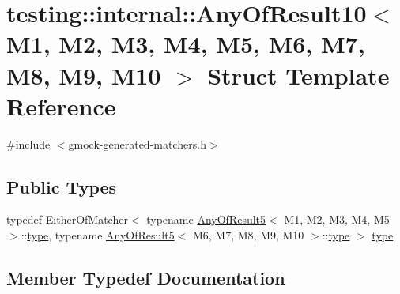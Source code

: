 \hypertarget{structtesting_1_1internal_1_1_any_of_result10}{}\section{testing\+::internal\+::Any\+Of\+Result10$<$ M1, M2, M3, M4, M5, M6, M7, M8, M9, M10 $>$ Struct Template Reference}
\label{structtesting_1_1internal_1_1_any_of_result10}


{\ttfamily \#include $<$gmock-\/generated-\/matchers.\+h$>$}

\subsection*{Public Types}
\begin{DoxyCompactItemize}
\item 
typedef Either\+Of\+Matcher$<$ typename \mbox{\hyperlink{structtesting_1_1internal_1_1_any_of_result5}{Any\+Of\+Result5}}$<$ M1, M2, M3, M4, M5 $>$\+::\mbox{\hyperlink{structtesting_1_1internal_1_1_any_of_result10_aa1cb3d733f29716f2015db8a2b6c1c94}{type}}, typename \mbox{\hyperlink{structtesting_1_1internal_1_1_any_of_result5}{Any\+Of\+Result5}}$<$ M6, M7, M8, M9, M10 $>$\+::\mbox{\hyperlink{structtesting_1_1internal_1_1_any_of_result10_aa1cb3d733f29716f2015db8a2b6c1c94}{type}} $>$ \mbox{\hyperlink{structtesting_1_1internal_1_1_any_of_result10_aa1cb3d733f29716f2015db8a2b6c1c94}{type}}
\end{DoxyCompactItemize}


\subsection{Member Typedef Documentation}
\mbox{\label{structtesting_1_1internal_1_1_any_of_result10_aa1cb3d733f29716f2015db8a2b6c1c94}} 
